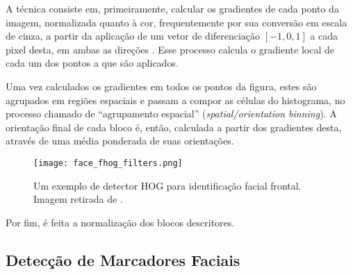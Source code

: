 A técnica consiste em, primeiramente, calcular os gradientes de cada ponto da imagem, normalizada quanto à cor, frequentemente por sua conversão em escala de cinza, a partir da aplicação de um vetor de diferenciação $[-1, 0, 1]$ a cada pixel desta, em ambas as direções \cite{dalalHistogramsOrientedGradients2005}.
Esse processo calcula o gradiente local de cada um dos pontos a que são aplicados.

Uma vez calculados os gradientes em todos os pontos da figura, estes são agrupados em regiões espaciais e passam a compor as células do histograma, no processo chamado de ``agrupamento espacial'' (\textit{spatial/orientation binning}).
A orientação final de cada bloco é, então, calculada a partir dos gradientes desta, através de uma média ponderada de suas orientações.

\begin{figure}[ht]
    \centering
    \texttt{[image: face\_fhog\_filters.png]}
    \caption{Um exemplo de detector HOG para identificação facial frontal. Imagem retirada de \cite{kingDlib18Released}.}
    \label{fig:dlib_hog}
\end{figure}

Por fim, é feita a normalização dos blocos descritores. %

\subsection{Detecção de Marcadores Faciais}
\label{sec:faciallm}